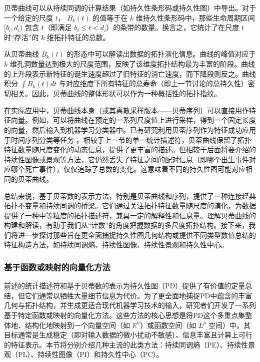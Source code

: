 贝蒂曲线可以从持续同调的计算结果（如持久性条形码或持久性图）中导出。对于一个给定的尺度 $t$， $B_k(t)$ 的值等于在 $k$ 维持久性条形码中，那些生命周期区间 $[b_i, d_i)$ 包含 $t$（即满足 $b_i \le t < d_i$）的条带的数量。换言之，它统计了在尺度 $t$ 时“存活”的 $k$ 维拓扑特征的总数。

从贝蒂曲线 $B_k(t)$ 的形态中可以解读出数据的拓扑演化信息。曲线的峰值对应于 $k$ 维孔洞数量达到极大的尺度范围，反映了该维度拓扑结构最为丰富的阶段。曲线的上升段表示新特征的诞生速度超过了旧特征的消亡速度，而下降段则反之。曲线积分 $\int B_k(t) dt$ 与对应维度下所有特征的总寿命（即上一节讨论的总持久性）密切相关。因此，贝蒂曲线的整体形状可以作为一种概括性的拓扑指纹。

在实际应用中，贝蒂曲线本身（或其离散采样版本——贝蒂序列）可以直接用作特征向量。例如，可以将曲线在预定的一系列尺度值上进行采样，得到一个固定长度的向量，然后输入到机器学习分类器中。已有研究利用贝蒂序列作为特征成功应用于时间序列分类等任务 。相较于上一节的单一统计描述符，贝蒂曲线保留了拓扑特征数量随尺度变化的动态信息，提供了更丰富的描述。但相较于后面将要介绍的持续性图像或景观等方法，它仍然丢失了特征之间的配对信息（即哪个出生事件对应哪个死亡事件），仅仅追踪了总数的变化。这意味着不同的持久性图可能对应相同的贝蒂曲线。

总结来说，基于贝蒂数的表示方法，特别是贝蒂曲线和序列，提供了一种连接经典拓扑不变量和持续同调的桥梁。它们通过关注拓扑特征数量随尺度的演化，为数据提供了一种中等粒度的拓扑描述符，兼具一定的解释性和信息量。理解贝蒂曲线的构建和解读，有助于我们从“计数”的角度把握数据的多尺度拓扑结构。接下来，我们将进一步探讨那些旨在更全面捕捉持久性图几何结构或提供不同类型数值总结的特征构造方法，如持续同调熵、持续性图像、持续性景观和持久性中心。

\subsubsection{基于函数或映射的向量化方法}
\label{sec:pd_vectorization_mapping}

前述的统计描述符和基于贝蒂数的表示为持久性图（PD）提供了有价值的定量总结，但它们通常以牺牲大量细节信息为代价。为了更全面地捕捉PD中蕴含的丰富几何与拓扑结构，并生成更适合现代机器学习技术的输入，研究者们开发了一系列基于特定函数或映射的向量化方法。这些方法的核心思想是将PD这个多重点集整体地、结构化地映射到一个向量空间（如 $\mathbb{R}^n$）或函数空间（如 $L^p$ 空间）中。其目标通常是生成稳定（即对输入数据的微小扰动不敏感）、信息丰富且计算上可行的特征表示。本节将分别介绍几种主流的此类方法：持续同调熵（PE）、持续性景观（PL）、持续性图像（PI）和持久性中心（PC）。

